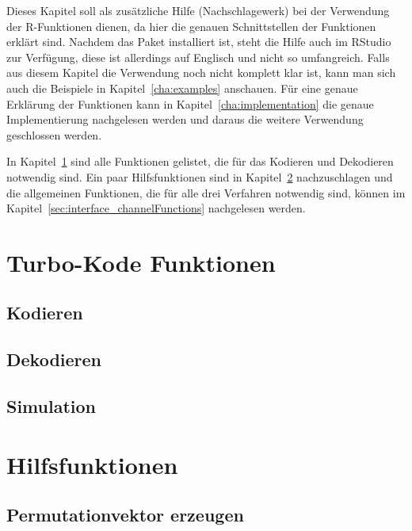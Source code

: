 Dieses Kapitel soll als zusätzliche Hilfe (Nachschlagewerk) bei der Verwendung der R-Funktionen dienen, da hier die genauen Schnittstellen der Funktionen erklärt sind. Nachdem das Paket installiert ist, steht die Hilfe auch im RStudio zur Verfügung, diese ist allerdings auf Englisch und nicht so umfangreich. Falls aus diesem Kapitel die Verwendung noch nicht komplett klar ist, kann man sich auch die Beispiele in Kapitel~\ref{cha:examples} anschauen. Für eine genaue Erklärung der Funktionen kann in Kapitel~\ref{cha:implementation} die genaue Implementierung nachgelesen werden und daraus die weitere Verwendung geschlossen werden.

In Kapitel~\ref{sec:interface_turboFunctions} sind alle Funktionen gelistet, die für das Kodieren und Dekodieren notwendig sind. Ein paar Hilfsfunktionen sind in Kapitel~\ref{sec:interface_helperFunctions} nachzuschlagen und die allgemeinen Funktionen, die für alle drei Verfahren notwendig sind, können im Kapitel~\ref{sec:interface_channelFunctions} nachgelesen werden. 
\section{Turbo-Kode Funktionen}
\label{sec:interface_turboFunctions}

\subsection{Kodieren}
\label{sec:interface_encode}


\subsection{Dekodieren}
\label{sec:interface_decode}


\subsection{Simulation}
\label{sec:interface_simulation}


\section{Hilfsfunktionen}
\label{sec:interface_helperFunctions}

\subsection{Permutationvektor erzeugen}
\label{sec:interface_permutation}


